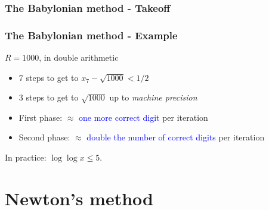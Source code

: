 \documentclass[aspectratio=149]{beamer}
\begin{document}
\begin{frame}
  \frametitle{The Babylonian method - Takeoff}

\end{frame}

\begin{frame}
  \frametitle{The Babylonian method - Example}
  $R=1000$, in double arithmetic
  \begin{itemize}
    \item $7$ steps to get to $x_7 - \sqrt{1000} < 1/2$
          \item $3$ steps to get to $\sqrt{1000}$ up to \textit{machine precision}
          \item First phase: $\approx$ \textcolor{blue}{one more correct digit} per iteration
          \item Second phase: $\approx$ \textcolor{blue}{double the number of correct digits} per iteration
  \end{itemize}

  \begin{center}
    In practice: $\log \log x \le 5$.
  \end{center}

\end{frame}


\section{Newton's method}%
\end{document}
